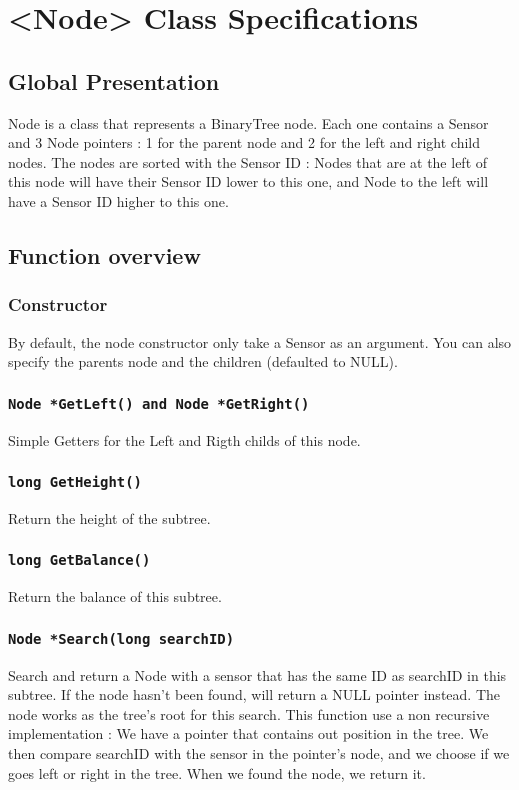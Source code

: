 \documentclass[10pt]{article}
\begin{document}
\section{<Node> Class Specifications}
\subsection{Global Presentation}


Node is a class that represents a BinaryTree node. Each one contains a Sensor and 3 Node pointers : 1 for the parent node and 2 for the left and right child nodes. The nodes are sorted with the Sensor ID : Nodes that are at the left of this node will have their Sensor ID lower to this one, and Node to the left will have a Sensor ID higher to this one.
\subsection{Function overview}
\subsubsection*{Constructor}
By default, the node constructor only take a Sensor as an argument. You can also specify the parents node and the children (defaulted to NULL).
\subsubsection*{\tt Node *GetLeft()  and Node *GetRight() }
Simple Getters for the Left and Rigth childs of this node.

\subsubsection*{\tt long GetHeight()}
Return the height of the subtree.

\subsubsection*{\tt long GetBalance()}
Return the balance of this subtree.

\subsubsection*{\tt Node *Search(long searchID)}
Search and return a Node with a sensor that has the same ID as searchID in this subtree. If the node hasn't been found, will return a NULL pointer instead.
The node works as the tree's root for this search. This function use a non recursive implementation : We have a pointer that contains out position in the tree. We then compare searchID with the sensor in the pointer's node, and we choose if we goes left or right in the tree. When we found the node, we return it.
\end{document}
